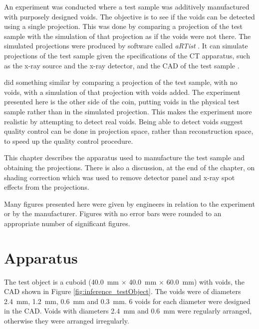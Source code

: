 An experiment was conducted where a test sample was additively manufactured with purposely designed voids. The objective is to see if the voids can be detected using a single projection. This was done by comparing a projection of the test sample with the simulation of that projection as if the voids were not there. The simulated projections were produced by software called \emph{aRTist} \citep{bellon2007artist, jaenisch2008artist, bellon2012radiographic}. It can simulate projections of the test sample given the specifications of the CT apparatus, such as the x-ray source and the x-ray detector, and the CAD of the test sample \citep{bellon2011simulation, deresch2012simulating}.

\cite{brierley2018optimized} did something similar by comparing a projection of the test sample, with no voids, with a simulation of that projection with voids added. The experiment presented here is the other side of the coin, putting voids in the physical test sample rather than in the simulated projection. This makes the experiment more realistic by attempting to detect real voids. Being able to detect voids suggest quality control can be done in projection space, rather than reconstruction space, to speed up the quality control procedure.

This chapter describes the apparatus used to manufacture the test sample and obtaining the projections. There is also a discussion, at the end of the chapter, on shading correction which was used to remove detector panel and x-ray spot effects from the projections.

Many figures presented here were given by engineers in relation to the experiment or by the manufacturer. Figures with no error bars were rounded to an appropriate number of significant figures.

\section{Apparatus}

The test object is a cuboid (\SI{40.0}{\milli\metre} $\times$ \SI{40.0}{\milli\metre} $\times$ \SI{60.0}{\milli\metre}) with voids, the CAD shown in Figure \ref{fig:inference_testObject}. The voids were of diameters \SI{2.4}{\milli\metre}, \SI{1.2}{\milli\metre}, \SI{0.6}{\milli\metre} and \SI{0.3}{\milli\metre}. 6 voids for each diameter were designed in the CAD. Voids with diameters \SI{2.4}{\milli\metre} and \SI{0.6}{\milli\metre} were regularly arranged, otherwise they were arranged irregularly.


